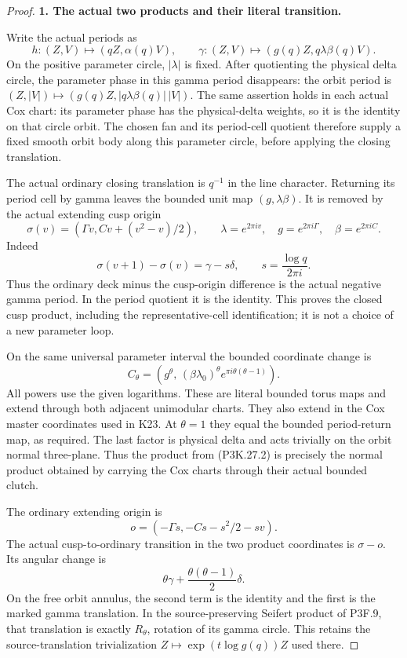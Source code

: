 \begin{proof}
\par\medskip\noindent\textbf{1. The actual two products and their literal transition.}\enspace


Write the actual periods as
\[
 h:(Z,V)\mapsto(qZ,\alpha(q)V),\qquad
 \gamma:(Z,V)\mapsto(g(q)Z,q\lambda\beta(q)V).
\]
On the positive parameter circle, \(|\lambda|\) is fixed.
After quotienting the physical delta circle, the parameter
phase in this gamma period disappears: the orbit period is
\((Z,|V|)\mapsto(g(q)Z,|q\lambda\beta(q)|\,|V|)\).
The same assertion holds in each actual Cox chart: its
parameter phase has the physical-delta weights, so it is the
identity on that circle orbit. The chosen fan and its
period-cell quotient therefore supply a fixed smooth orbit
body along this parameter circle, before applying the
closing translation.

The actual ordinary closing translation is \(q^{-1}\) in the
line character. Returning its period cell by gamma leaves
the bounded unit map \((g,\lambda\beta)\). It is removed by
the actual extending cusp origin
\[
 \sigma(v)=(\Gamma v,Cv+(v^2-v)/2),\qquad
 \lambda=e^{2\pi iv},\quad
 g=e^{2\pi i\Gamma},\quad\beta=e^{2\pi iC}.
                                                        \tag{P3K.27.2}
\]
Indeed
\[
 \sigma(v+1)-\sigma(v)=\gamma-s\delta,\qquad
             s=\frac{\log q}{2\pi i}.
\]
Thus the ordinary deck minus the cusp-origin difference is
the actual negative gamma period. In the period quotient
it is the identity. This proves the closed cusp product,
including the representative-cell identification; it is
not a choice of a new parameter loop.

On the same universal parameter interval the bounded
coordinate change is
\[
 C_\theta=
 \left(g^\theta,\,
       (\beta\lambda_0)^\theta
                       e^{\pi i\theta(\theta-1)}\right).
                                                        \tag{P3K.27.3}
\]
All powers use the given logarithms. These are literal
bounded torus maps and extend through both adjacent
unimodular charts. They also extend in the Cox master
coordinates used in K23. At \(\theta=1\) they equal the
bounded period-return map, as required. The last factor
is physical delta and acts trivially on the orbit normal
three-plane. Thus the product from (P3K.27.2) is precisely
the normal product obtained by carrying the Cox charts
through their actual bounded clutch.

The ordinary extending origin is
\[
                  o=(-\Gamma s,-Cs-s^2/2-sv).
\]
The actual cusp-to-ordinary transition in the two product
coordinates is \(\sigma-o\). Its angular change is
\[
        \theta\gamma+\frac{\theta(\theta-1)}2\delta.
                                                        \tag{P3K.27.4}
\]
On the free orbit annulus, the second term is the identity
and the first is the marked gamma translation. In the
source-preserving Seifert product of P3F.9, that translation
is exactly \(R_\theta\), rotation of its gamma circle.
This retains the source-translation trivialization
\(Z\mapsto\exp(t\log g(q))Z\) used there.


\end{proof}
